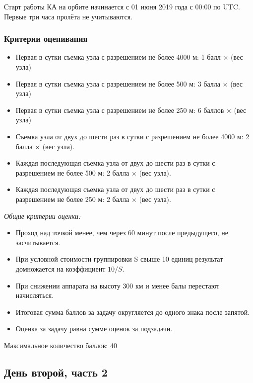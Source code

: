 Старт работы КА на орбите начинается с 01 июня 2019 года с 00:00 по UTC. Первые три часа пролёта не учитываются.

\subsubsection*{Критерии оценивания}

\begin{itemize}
    \item Первая в сутки съемка узла с разрешением не более 4000 м: 1 балл $\times$ (вес узла)
    \item Первая в сутки съемка узла с разрешением не более 500 м: 3 балла $\times$ (вес узла)
    \item Первая в сутки съемка узла с разрешением не более 250 м: 6 баллов $\times$ (вес узла)
    \item Съемка узла от двух до шести раз в сутки с разрешением не более 4000 м: 2 балла $\times$ (вес узла).
    \item Каждая последующая съемка узла от двух до шести раз в сутки с разрешением не более 500 м: 2 балла $\times$ (вес узла).
    \item Каждая последующая съемка узла от двух до шести раз в сутки с разрешением не более 250 м: 2 балла $\times$ (вес узла).
\end{itemize}

\textit{Общие критерии оценки:}

\begin{itemize}
    \item Проход над точкой менее, чем через 60 минут после предыдущего, не засчитывается.
    \item При условной стоимости группировки S свыше 10 единиц результат домножается на коэффициент $10/S$.
    \item При снижении аппарата на высоту 300 км и менее балы перестают начисляться.
    \item Итоговая сумма баллов за задачу округляется до одного знака после запятой.
    \item Оценка за задачу равна сумме оценок за подзадачи.
\end{itemize}

Максимальное количество баллов: 40

\subsection*{День второй, часть 2}

